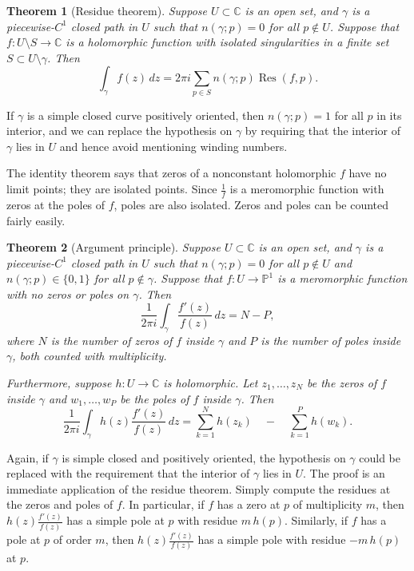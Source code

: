 \documentclass[12pt,openany]{book}
\newcommand{\C}{{\mathbb{C}}}
\newcommand{\bP}{{\mathbb{P}}}
\theoremstyle{plain}
\newtheorem{thm}{Theorem}[section]
\theoremstyle{remark}
\theoremstyle{definition}
\theoremstyle{exercise}
\theoremstyle{example}
\begin{document}
\begin{thm}[Residue theorem]\label{thm:residue}
Suppose $U \subset \C$ is an open set, and $\gamma$ is a piecewise-$C^1$
closed path in $U$
such that $n(\gamma;p)=0$ for all $p \notin U$.
Suppose that $f \colon U \setminus S \to \C$ is a holomorphic function with isolated
singularities in a finite set $S \subset U \setminus \gamma$.
Then
\begin{equation*}
\int_{\gamma} f(z) \, dz = 2\pi i \sum_{p \in S} n(\gamma;p) \operatorname{Res}(f,p) .
\end{equation*}
\end{thm}

If $\gamma$ is a simple closed curve positively oriented,
then $n(\gamma;p)=1$ for all $p$ in
its interior, and we can replace the hypothesis on $\gamma$
by requiring that the interior of $\gamma$ lies in $U$ and hence avoid
mentioning winding numbers.

The identity theorem says that zeros of a nonconstant holomorphic $f$
have no limit points; they are isolated points.
Since $\frac{1}{f}$ is a meromorphic
function with zeros at the poles of $f$, poles are also
isolated.  Zeros and poles can be counted fairly easily.

\begin{thm}[Argument principle]\label{thm:onevarargprinc}
Suppose $U \subset \C$ is an open set, and $\gamma$ is a piecewise-$C^1$
closed path in $U$ such that
$n(\gamma;p)=0$ for all $p \notin U$ and $n(\gamma;p) \in \{ 0,1 \}$ for
all $p \notin \gamma$.
Suppose that $f \colon U \to \bP^1$ is a meromorphic function with no zeros
or poles on $\gamma$.
Then
\begin{equation*}
\frac{1}{2\pi i}
\int_\gamma \frac{f'(z)}{f(z)} \, dz
= N - P ,
\end{equation*}
where $N$ is the number of zeros of $f$ inside $\gamma$ and $P$ is the
number of poles inside $\gamma$, both counted with multiplicity.

Furthermore, suppose $h \colon U \to \C$ is holomorphic.
Let $z_1,\ldots,z_N$ be the zeros of $f$ inside $\gamma$ and
$w_1,\ldots,w_P$ be the poles of $f$ inside $\gamma$.
Then
\begin{equation*}
\frac{1}{2\pi i}
\int_\gamma h(z) \frac{f'(z)}{f(z)} \, dz
=
\sum_{k=1}^N h(z_k)
\quad
-
\quad
\sum_{k=1}^P h(w_k) .
\end{equation*}
\end{thm}

Again, if $\gamma$ is simple closed and positively oriented,
the hypothesis on $\gamma$ could be replaced with the requirement that
the interior of $\gamma$ lies in $U$.
The proof is an immediate application of the residue theorem.  Simply
compute the residues at the zeros and poles of $f$.  In particular,
if $f$ has a zero at $p$ of multiplicity $m$, then $h(z) \frac{f'(z)}{f(z)}$
has a simple pole
at $p$ with residue $m\, h(p)$.  Similarly, if $f$ has a pole at $p$ of
order $m$,
then $h(z) \frac{f'(z)}{f(z)}$ has a simple pole with residue $-m\, h(p)$ at $p$.
\end{document}
